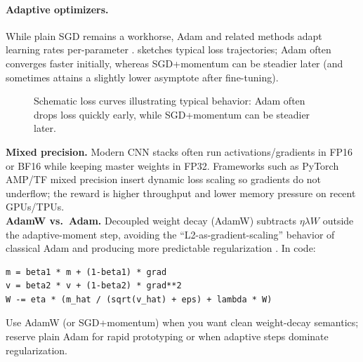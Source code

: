 \paragraph{Adaptive optimizers.} While plain SGD remains a workhorse, Adam and related methods adapt learning rates per-parameter \citep{Kingma2015}.  sketches typical loss trajectories; Adam often converges faster initially, whereas SGD+momentum can be steadier later (and sometimes attains a slightly lower asymptote after fine-tuning).

\begin{figure}[t]
    \centering
    \caption{Schematic loss curves illustrating typical behavior: Adam often drops loss quickly early, while SGD+momentum can be steadier later.}
    \label{fig:lec6-optimizers}
\end{figure}


\begin{tcolorbox}[summarybox, title={Practical optimizer notes}]
\textbf{Mixed precision.} Modern CNN stacks often run activations/gradients in FP16 or BF16 while keeping master weights in FP32. Frameworks such as PyTorch AMP/TF mixed precision insert dynamic loss scaling so gradients do not underflow; the reward is higher throughput and lower memory pressure on recent GPUs/TPUs.\\
\textbf{AdamW vs.\ Adam.} Decoupled weight decay (AdamW) subtracts \(\eta\lambda W\) outside the adaptive-moment step, avoiding the ``L2-as-gradient-scaling'' behavior of classical Adam and producing more predictable regularization \citep{Loshchilov2019}. In code:
\begin{verbatim}
m = beta1 * m + (1-beta1) * grad
v = beta2 * v + (1-beta2) * grad**2
W -= eta * (m_hat / (sqrt(v_hat) + eps) + lambda * W)
\end{verbatim}
Use AdamW (or SGD+momentum) when you want clean weight-decay semantics; reserve plain Adam for rapid prototyping or when adaptive steps dominate regularization.
\end{tcolorbox}

